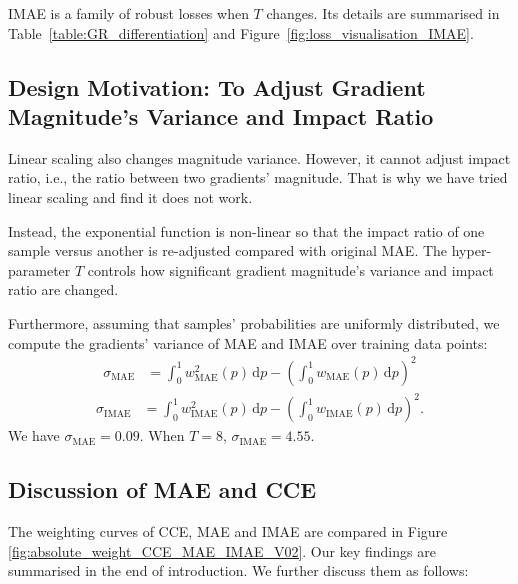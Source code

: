 \documentclass{article}
\begin{document}
IMAE is a family of robust losses when $T$ changes. Its details are summarised in Table~\ref{table:GR_differentiation} and Figure~\ref{fig:loss_visualisation_IMAE}. 



\noindent
\subsection{Design Motivation: To Adjust Gradient Magnitude's Variance and Impact Ratio}
Linear scaling also changes magnitude variance. However, it cannot adjust impact ratio, i.e., the ratio between two gradients' magnitude. That is why we have tried linear scaling and find it does not work. 
 
Instead, the exponential function is non-linear so that the impact ratio of one sample versus another is re-adjusted compared with original MAE. 
The hyper-parameter $T$ controls how significant gradient magnitude's variance and impact ratio are changed. 

Furthermore, assuming that samples' probabilities are uniformly distributed, we compute the gradients' variance of MAE and IMAE over training data points: 
\begin{equation}
	\begin{aligned}
		\sigma_{\mathrm{MAE}}&=
		\displaystyle\int^{1}_{0} 
		w_{\mathrm{MAE}}^{2} (p)
		\, \mathrm d p
		- (\displaystyle\int^{1}_{0} 
		w_{\mathrm{MAE}} (p)
		\, \mathrm d p)^2
	\end{aligned}
\end{equation}
\vspace{-0.6cm}
\begin{equation}
	\label{eq:variance_IMAE}
	\begin{aligned}
		\sigma_{\mathrm{IMAE}}&=
		\displaystyle\int^{1}_{0} 
		w_{\mathrm{\mathrm{IMAE}}}^{2} (p)
		\, \mathrm d p
		- (\displaystyle\int^{1}_{0} 
		w_{\mathrm{IMAE}} (p)
		\, \mathrm d p)^2.
	\end{aligned}
\end{equation}
We have $\sigma_{\mathrm{MAE}}=0.09$. When $T=8$, $\sigma_{\mathrm{IMAE}} = 4.55$. 






\noindent
\subsection{Discussion of MAE and CCE}
The weighting curves of CCE, MAE and IMAE are compared in Figure \ref{fig:absolute_weight_CCE_MAE_IMAE_V02}.  
Our key findings are summarised in the end of introduction. 
We further discuss them as follows:
\end{document}

